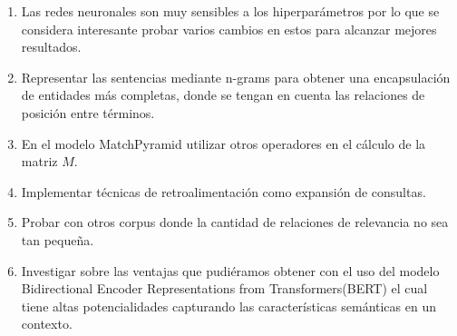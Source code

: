 \documentclass{llncs}
\begin{document}
\begin{enumerate}
	\item Las redes neuronales son muy sensibles a los hiperparámetros por lo que se considera interesante probar varios cambios en estos para alcanzar mejores resultados.
	\item Representar las sentencias mediante n-grams para obtener una encapsulación de entidades más completas, donde se tengan en cuenta las relaciones de posición entre términos.
	\item En el modelo MatchPyramid utilizar otros operadores en el cálculo de la matriz $M$.
	\item Implementar técnicas de retroalimentación como expansión de consultas. 
	\item Probar con otros corpus donde la cantidad de relaciones de relevancia no sea tan pequeña.
	\item Investigar sobre las ventajas que pudiéramos obtener con el uso del modelo Bidirectional Encoder Representations from Transformers(BERT) el cual tiene altas potencialidades capturando las características semánticas en un contexto.
\end{enumerate}
\end{document}

